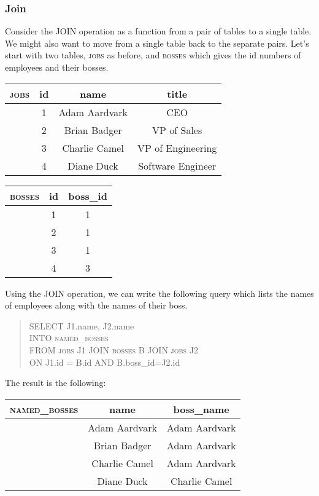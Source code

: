 \documentclass{article}
\begin{document}
\subsubsection*{Join}

Consider the JOIN operation as a function from a pair of tables to a single
table. We might also want to move from a single table back to the 
separate pairs. Let's start with two tables, \textsc{jobs} as before,
and \textsc{bosses} which gives the id numbers of employees and their bosses.
\begin{center} \begin{tabular} {c | c c c}
    \textsc{jobs} & id & name & title \\
    \hline
    & 1 & Adam Aardvark & CEO \\
    & 2 & Brian Badger & VP of Sales \\
    & 3 & Charlie Camel & VP of Engineering \\
    & 4 & Diane Duck & Software Engineer
\end{tabular} \end{center}
\begin{center} \begin{tabular} {c | c c }
    \textsc{bosses} & id & boss\_id \\
    \hline
    & 1 & 1 \\
    & 2 & 1 \\
    & 3 & 1 \\
    & 4 & 3 
\end{tabular} \end{center}
Using the JOIN operation, we can write the following query which lists 
the names of employees along with the names of their boss.
\begin{quote}
    SELECT J1.name, J2.name \\
    INTO \textsc{named\_bosses} \\
    FROM \textsc{jobs} J1 JOIN \textsc{bosses} B JOIN \textsc{jobs} J2 \\
    ON J1.id = B.id AND B.boss\_id=J2.id
\end{quote}
The result is the following:
\begin{center} \begin{tabular} {c | c c }
    \textsc{named\_bosses} & name & boss\_name \\
    \hline
    & Adam Aardvark & Adam Aardvark \\
    & Brian Badger & Adam Aardvark \\
    & Charlie Camel & Adam Aardvark \\
    & Diane Duck & Charlie Camel
\end{tabular} \end{center}
\end{document}
